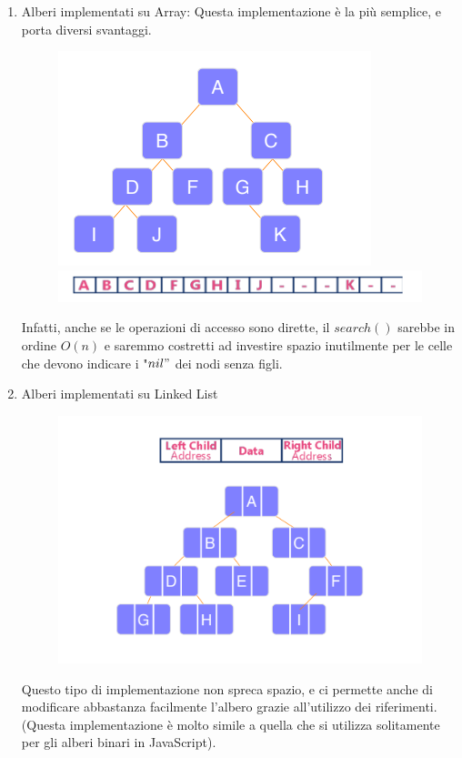 \documentclass{article}
\begin{document}
\begin{enumerate}
    \item Alberi implementati su Array: Questa implementazione è la più semplice, e porta diversi svantaggi.

    \begin{figure}[htbp]
        \center
        \includegraphics[scale=0.75]{img/alberoBinarioArray1.png}
        \includegraphics[scale=0.75]{img/alberoBinarioArray2.png}
    \end{figure}

    Infatti, anche se le operazioni di accesso sono dirette, il $search()$ sarebbe in ordine $O(n)$
    e saremmo costretti ad investire spazio inutilmente per le celle che devono indicare i "\(nil"\) dei nodi senza figli.

    \item Alberi implementati su Linked List

    \begin{figure}[htbp]
        \center
        \includegraphics[scale=0.75]{img/listaAlbero.png}
    \end{figure}

    Questo tipo di implementazione non spreca spazio, e ci permette anche di modificare abbastanza facilmente l'albero grazie all'utilizzo dei riferimenti. (Questa implementazione è molto simile a quella che si utilizza solitamente per gli alberi binari in JavaScript).
    
\end{enumerate}
\end{document}
